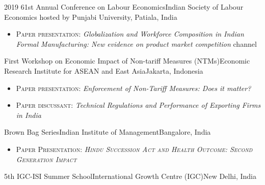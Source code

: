 %
%
%


\begin{conference}

  \experience
    {2019}   {61st Annual Conference on Labour Economics}{Indian Society of Labour Economics}{ hosted by Punjabi University, Patiala, India}
    {} {
                      \begin{itemize}
                        \item \textsc{Paper presentation:} \textit{Globalization and Workforce Composition in Indian Formal Manufacturing:  New evidence on product market competition} channel  \vspace{10pt}
                      \end{itemize}
                    }
  \experience
    {}   {First Workshop on Economic Impact of Non-tariff Measures (NTMs)}{Economic Research Institute for ASEAN and East Asia}{Jakarta, Indonesia}
    {} {
                      \begin{itemize}
                        \item \textsc{Paper presentation:} \textit{Enforcement of Non-Tariff Measures: Does it matter?}
                        \item \textsc{Paper discussant:} \textit{Technical Regulations and Performance of Exporting Firms in India \vspace{10pt}}
                      \end{itemize}
                    }
  \experience
    {}   {Brown Bag Series}{Indian Institute of Management}{Bangalore, India}
    {} {
                      \begin{itemize}
                        \item \textsc{Paper Presentation: \textit{Hindu Succession Act and Health Outcome: Second Generation Impact} \vspace{10pt}}             
                      \end{itemize}
                    }
  \experience
    {}   {5th IGC-ISI Summer School}{International Growth Centre (IGC)}{New Delhi, India}
    {} {
                      \begin{itemize}

\end{itemize}}
\end{conference}
